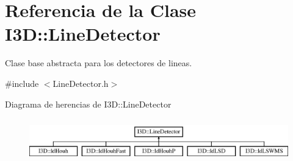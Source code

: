 \hypertarget{class_i3_d_1_1_line_detector}{}\section{Referencia de la Clase I3D\+:\+:Line\+Detector}
\label{class_i3_d_1_1_line_detector}


Clase base abstracta para los detectores de lineas.  




{\ttfamily \#include $<$Line\+Detector.\+h$>$}

Diagrama de herencias de I3D\+:\+:Line\+Detector\begin{figure}[H]
\begin{center}
\leavevmode
\includegraphics[height=1.914530cm]{class_i3_d_1_1_line_detector}
\end{center}
\end{figure}
